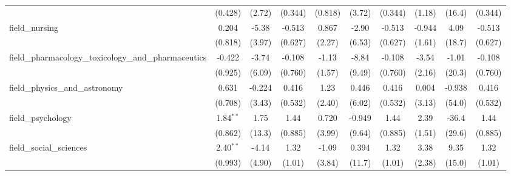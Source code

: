 \begin{tabular}{lccccccccc}
                                                               & (0.428)        & (2.72)         & (0.344)        & (0.818)        & (3.72)        & (0.344)        & (1.18)         & (16.4)         & (0.344)\\   
   field\_nursing                                              & 0.204          & -5.38          & -0.513         & 0.867          & -2.90         & -0.513         & -0.944         & 4.09           & -0.513\\   
                                                               & (0.818)        & (3.97)         & (0.627)        & (2.27)         & (6.53)        & (0.627)        & (1.61)         & (18.7)         & (0.627)\\   
   field\_pharmacology\_toxicology\_and\_pharmaceutics         & -0.422         & -3.74          & -0.108         & -1.13          & -8.84         & -0.108         & -3.54          & -1.01          & -0.108\\   
                                                               & (0.925)        & (6.09)         & (0.760)        & (1.57)         & (9.49)        & (0.760)        & (2.16)         & (20.3)         & (0.760)\\   
   field\_physics\_and\_astronomy                              & 0.631          & -0.224         & 0.416          & 1.23           & 0.446         & 0.416          & 0.004          & -0.938         & 0.416\\   
                                                               & (0.708)        & (3.43)         & (0.532)        & (2.40)         & (6.02)        & (0.532)        & (3.13)         & (54.0)         & (0.532)\\   
   field\_psychology                                           & 1.84$^{**}$    & 1.75           & 1.44           & 0.720          & -0.949        & 1.44           & 2.39           & -36.4          & 1.44\\   
                                                               & (0.862)        & (13.3)         & (0.885)        & (3.99)         & (9.64)        & (0.885)        & (1.51)         & (29.6)         & (0.885)\\   
   field\_social\_sciences                                     & 2.40$^{**}$    & -4.14          & 1.32           & -1.09          & 0.394         & 1.32           & 3.38           & 9.35           & 1.32\\   
                                                               & (0.993)        & (4.90)         & (1.01)         & (3.84)         & (11.7)        & (1.01)         & (2.38)         & (15.0)         & (1.01)\\   

\end{tabular}
